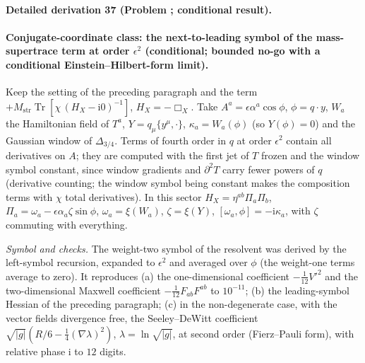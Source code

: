 \paragraph{Detailed derivation 37 (Problem ; conditional result).} \label{ref:detail-36} %



\paragraph{Conjugate-coordinate class: the next-to-leading symbol of the mass-supertrace term at order \(\epsilon^2\) (conditional; bounded no-go with a conditional Einstein--Hilbert-form limit).}

Keep the setting of the preceding paragraph and the term \(+M_{\mathrm{str}}\operatorname{Tr}[\chi\,(H_X-\mathrm i0)^{-1}]\), \(H_X=-\Box_X\). Take \(A^a=\epsilon\alpha^a\cos\phi\), \(\phi=q\cdot y\), \(W_a\) the Hamiltonian field of \(T^a\), \(Y=q_\mu\{y^\mu,\cdot\}\), \(\kappa_a=W_a(\phi)\) (so \(Y(\phi)=0\)) and the Gaussian window of \(\Delta_{3/4}\). Terms of fourth order in \(q\) at order \(\epsilon^2\) contain all derivatives on \(A\); they are computed with the first jet of \(T\) frozen and the window symbol constant, since window gradients and \(\partial^2T\) carry fewer powers of \(q\) (derivative counting; the window symbol being constant makes the composition terms with \(\chi\) total derivatives). In this sector \(H_X=\eta^{ab}\Pi_a\Pi_b\), \(\Pi_a=\omega_a-\epsilon\alpha_a\zeta\sin\phi\), \(\omega_a=\xi(W_a)\), \(\zeta=\xi(Y)\), \([\omega_a,\phi]=-\mathrm i\kappa_a\), with \(\zeta\) commuting with everything.



\emph{Symbol and checks.} The weight-two symbol of the resolvent was derived by the left-symbol recursion, expanded to \(\epsilon^2\) and averaged over \(\phi\) (the weight-one terms average to zero). It reproduces (a) the one-dimensional coefficient \(-\tfrac1{12}V'^2\) and the two-dimensional Maxwell coefficient \(-\tfrac1{12}F_{ab}F^{ab}\) to \(10^{-11}\); (b) the leading-symbol Hessian of the preceding paragraph; (c) in the non-degenerate case, with the vector fields divergence free, the Seeley--DeWitt coefficient \(\sqrt{|g|}(R/6-\tfrac14(\nabla\lambda)^2)\), \(\lambda=\ln\sqrt{|g|}\), at second order (Fierz--Pauli form), with relative phase \(\mathrm i\) to \(12\) digits.



